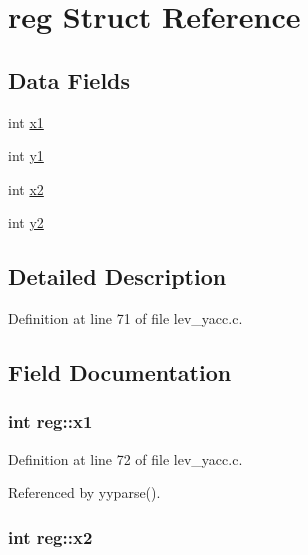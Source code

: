 \hypertarget{structreg}{\section{reg Struct Reference}
\label{structreg}
}
\subsection*{Data Fields}
\begin{DoxyCompactItemize}
\item 
int \hyperlink{structreg_a7e20f0abde88bf5e6491bd0e9fe5defd}{x1}
\item 
int \hyperlink{structreg_a5c9850f86e80d152080f032572dec958}{y1}
\item 
int \hyperlink{structreg_ab180cca29d72e4f527f28a93a53086d9}{x2}
\item 
int \hyperlink{structreg_a16227244e3d60fed8afab866fcb1403f}{y2}
\end{DoxyCompactItemize}


\subsection{Detailed Description}


Definition at line 71 of file lev\+\_\+yacc.\+c.



\subsection{Field Documentation}
\hypertarget{structreg_a7e20f0abde88bf5e6491bd0e9fe5defd}{
\subsubsection[{x1}]{\setlength{\rightskip}{0pt plus 5cm}int reg\+::x1}}\label{structreg_a7e20f0abde88bf5e6491bd0e9fe5defd}


Definition at line 72 of file lev\+\_\+yacc.\+c.



Referenced by yyparse().

\hypertarget{structreg_ab180cca29d72e4f527f28a93a53086d9}{
\subsubsection[{x2}]{\setlength{\rightskip}{0pt plus 5cm}int reg\+::x2}}\label{structreg_ab180cca29d72e4f527f28a93a53086d9}


